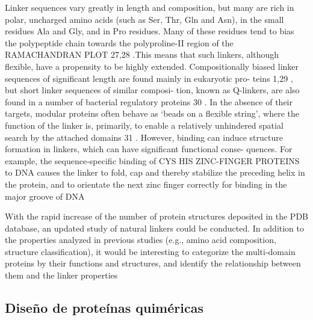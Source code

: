Linker
sequences vary greatly in length and composition, but
many are rich in polar, uncharged amino acids (such as
Ser, Thr, Gln and Asn), in the small residues Ala and Gly,
and in Pro residues. Many of these residues tend to bias
the polypeptide chain towards the polyproline-II region
of the RAMACHANDRAN PLOT 27,28 .This means that such
linkers, although flexible, have a propensity to be highly
extended. Compositionally biased linker sequences of
significant length are found mainly in eukaryotic pro-
teins 1,29 , but short linker sequences of similar composi-
tion, known as Q-linkers, are also found in a number of
bacterial regulatory proteins 30 .
In the absence of their targets, modular proteins
often behave as ‘beads on a flexible string’, where the
function of the linker is, primarily, to enable a relatively
unhindered spatial search by the attached domains 31 .
However, binding can induce structure formation in
linkers, which can have significant functional conse-
quences. For example, the sequence-specific binding of
CYS HIS ZINC-FINGER PROTEINS to DNA causes the linker to
fold, cap and thereby stabilize the preceding helix in the
protein, and to orientate the next zinc finger correctly
for binding in the major groove of DNA


















With the rapid increase of the number of protein structures deposited in the PDB database, an updated study of natural linkers could be conducted. 
In addition to the properties analyzed in previous studies (e.g., amino acid composition, structure classification), 
it would be interesting to categorize the multi-domain proteins by their functions and structures, and identify the relationship between them and the linker properties










\subsection{Diseño de proteínas quiméricas}



